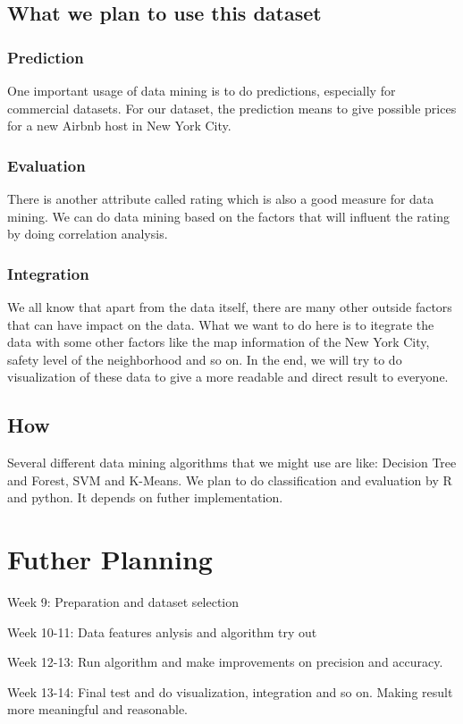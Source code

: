 \documentclass{sig-alternate}
\begin{document}
\subsection{What we plan to use this dataset}
\subsubsection{Prediction}
One important usage of data mining is to do predictions, especially for commercial
datasets. For our dataset, the prediction means to give possible prices for a new
Airbnb host in New York City. 
\subsubsection{Evaluation}
There is another attribute called rating which is also a good measure for data mining. 
We can do data mining based on the factors that will influent the rating by doing correlation
analysis. 
\subsubsection{Integration}
We all know that apart from the data itself, there are many other outside factors that can 
have impact on the data. What we want to do here is to itegrate the data with some other factors
like the map information of the New York City, safety level of the neighborhood and so on.
In the end, we will try to do visualization of these data to give a more readable and direct result to everyone.

\subsection{How}
Several different data mining algorithms that we might use are like: Decision Tree and Forest, SVM and K-Means.
We plan to do classification and evaluation by R and python. It depends on futher implementation.

\section{Futher Planning}
Week 9: Preparation and dataset selection

Week 10-11: Data features anlysis and algorithm try out

Week 12-13: Run algorithm and make improvements on precision and accuracy.

Week 13-14: Final test and do visualization, integration and so on. Making result more meaningful and reasonable.
\end{document}
